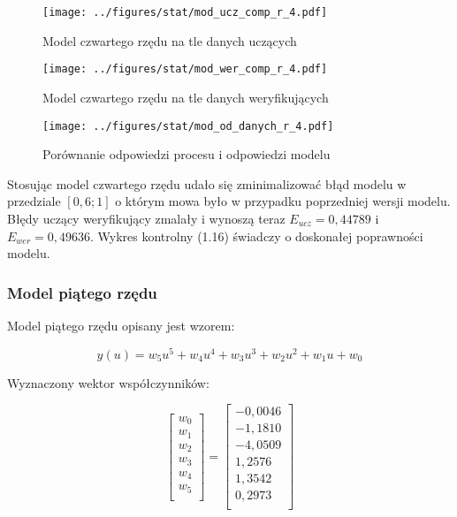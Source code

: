 \documentclass[a4paper,titlepage,11pt,floatssmall]{mwrep}
\begin{document}
\newpage

\begin{figure}[H]
\centering
\texttt{[image: ../figures/stat/mod\_ucz\_comp\_r\_4.pdf]}
\caption{Model czwartego rzędu na tle danych uczących}
\end{figure}

\begin{figure}[H]
\centering
\texttt{[image: ../figures/stat/mod\_wer\_comp\_r\_4.pdf]}
\caption{Model czwartego rzędu na tle danych weryfikujących}
\end{figure}

\newpage

\begin{figure}[H]
\centering
\texttt{[image: ../figures/stat/mod\_od\_danych\_r\_4.pdf]}
\caption{Porównanie odpowiedzi procesu i odpowiedzi modelu}
\end{figure}

Stosując model czwartego rzędu udało się zminimalizować błąd modelu w przedziale $[0,6 ; 1]$ o którym mowa było w przypadku poprzedniej wersji modelu. Błędy uczący weryfikujący zmalały i wynoszą teraz $E_{ucz} = 0,44789 $ i $E_{wer} = 0,49636$. Wykres kontrolny (1.16) świadczy o doskonałej poprawności modelu. 

\subsubsection{Model piątego rzędu}
Model piątego rzędu opisany jest wzorem:

\begin{equation*}
y(u) = w_5u^5 + w_4u^4 + w_3u^3 + w_2u^2 + w_1u + w_0
\end{equation*}

Wyznaczony wektor współczynników:

$$
\left[\begin{array}{c}
w_0 \\
w_1 \\
w_2 \\
w_3 \\
w_4 \\
w_5 \\
\end{array} \right]
= 
\left[\begin{array}{c}
-0,0046	\\
-1,1810 \\
-4,0509 \\
1,2576 \\
1,3542 \\
0,2973 \\ 
\end{array} \right]
$$
\end{document}
